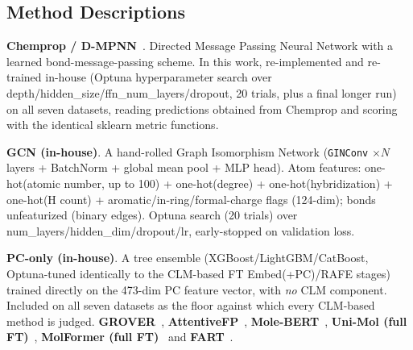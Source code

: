 \documentclass[9pt,a4paper]{article}
\begin{document}
\subsection*{Method Descriptions}

\noindent\textbf{Chemprop / D-MPNN}~\cite{yang2019chemprop}.
Directed Message Passing Neural Network with a learned bond-message-passing scheme.
In this work, re-implemented and re-trained in-house (Optuna hyperparameter
search over depth/hidden\_size/ffn\_num\_layers/dropout, 20 trials, plus a final
longer run) on all seven datasets, reading predictions obtained from Chemprop and scoring with the identical sklearn metric functions.

\noindent\textbf{GCN (in-house)}.
A hand-rolled Graph Isomorphism Network (\texttt{GINConv} $\times N$ layers +
BatchNorm + global mean pool + MLP head). Atom features: one-hot(atomic number,
up to 100) + one-hot(degree) + one-hot(hybridization) + one-hot(H count) +
aromatic/in-ring/formal-charge flags (124-dim); bonds unfeaturized (binary edges).
Optuna search (20 trials) over num\_layers/hidden\_dim/dropout/lr, early-stopped
on validation loss.

\noindent\textbf{PC-only (in-house)}.
A tree ensemble (XGBoost/LightGBM/CatBoost, Optuna-tuned identically to the
CLM-based FT Embed(+PC)/RAFE stages) trained directly on the 473-dim PC feature
vector, with \emph{no} CLM component. Included on all seven datasets as the floor
against which every CLM-based method is judged. \textbf{GROVER}~\cite{rong2020grover}, \textbf{AttentiveFP}~\cite{xiong2020attentivefp},
\textbf{Mole-BERT}~\cite{xia2023molecbert}, \textbf{Uni-Mol (full FT)}~\cite{zhou2023unimol},
\textbf{MolFormer (full FT)}~\cite{ross2022molformer} and \textbf{FART}~\cite{zimmermann2024fart}.
\end{document}
